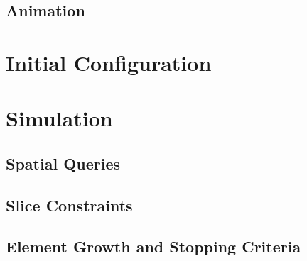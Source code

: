 \subsection{Animation}
\label{animationpak_animation}


\section{Initial Configuration}
\label{animationpak_}


\section{Simulation}
\label{animationpak_}


\subsection{Spatial Queries}
\label{animationpak_}


\subsection{Slice Constraints}
\label{animationpak_}


\subsection{Element Growth and Stopping Criteria}
\label{animationpak_}


